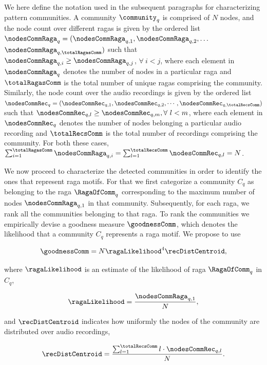 {We here define the notation used in the subsequent paragraphs for characterizing pattern communities. A community $\community_q$ is comprised of $N$ nodes, and the node count over different \glspl{raga} is given by the ordered list ${{\nodesCommRaga}_q} = (\nodesCommRaga_{q,1}, \nodesCommRaga_{q,2},\dots$ $\nodesCommRaga_{q,\totalRagasComm})$ such that $\nodesCommRaga_{q,i} \geq \nodesCommRaga_{q,j}$, $\forall~ i < j$,
where each element in $\nodesCommRaga_{q}$ denotes the number of nodes in a particular \gls{raga} and $\totalRagasComm$ is the total number of unique \glspl{raga} comprising the community. Similarly, the node count over the audio recordings is given by the ordered list ${{\nodesCommRec}_q} = (\nodesCommRec_{q,1}, \nodesCommRec_{q,2},\cdots,\nodesCommRec_{q,\totalRecsComm})$ such that $\nodesCommRec_{q,l} \geq \nodesCommRec_{q,m}, \forall~l < m$,  where each element in $\nodesCommRec_{q}$ denotes the number of nodes belonging a particular audio recording and $\totalRecsComm$ is the total number of recordings comprising the community. For both these cases, $\sum_{i=1}^{\totalRagasComm}\nodesCommRaga_{q,i} = \sum_{l=1}^{\totalRecsComm}\nodesCommRec_{q,l} = N$.

We now proceed to characterize the detected communities in order to identify the ones that represent \gls{raga} motifs. For that we first categorize a community $C_q$ as belonging to the \gls{raga} $\RagaOfComm_q$ corresponding to the maximum number of nodes $\nodesCommRaga_{q,1}$ in that community. Subsequently, for each \gls{raga}, we rank all the communities belonging to that \gls{raga}. To rank the communities we empirically devise a goodness measure $\goodnessComm$, which denotes the likelihood that a community $C_q$ represents a \gls{raga} motif. We propose to use

\begin{equation}
\goodnessComm = N \ragaLikelihood^4 \recDistCentroid,
\label{eq:gamma_pattern_characterization}
\end{equation}

where $\ragaLikelihood$ is an estimate of the likelihood of \gls{raga} $\RagaOfComm_q$ in $C_q$, 

\begin{equation}
\ragaLikelihood = \frac{\nodesCommRaga_{q,1}}{N},
\end{equation}

and $\recDistCentroid$ indicates how uniformly the nodes of the community are distributed over audio recordings,

\begin{equation}
\recDistCentroid = \frac{\sum_{l=1}^{\totalRecsComm}l \cdot \nodesCommRec_{q,l}}{N}.
\end{equation}

}
